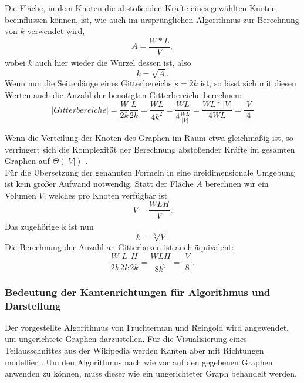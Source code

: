 \documentclass[12pt, a4paper]{article}
\begin{document}
Die Fläche, in dem Knoten die abstoßenden Kräfte eines gewählten Knoten beeinflussen können, ist, wie auch im ursprünglichen Algorithmus zur Berechnung von $k$ verwendet wird,
\begin{equation}
A = \frac{W*L}{|V|},
\end{equation}
wobei $k$ auch hier wieder die Wurzel dessen ist, also
\begin{equation}
k = \sqrt{A}.
\end{equation}
Wenn nun die Seitenlänge eines Gitterbereichs $s=2k$ ist, so lässt sich mit diesen Werten auch die Anzahl der benötigten Gitterbereiche berechnen:
\begin{equation}
|Gitterbereiche| = \frac{W}{2k}\frac{L}{2k} = \frac{WL}{4k^2} = \frac{WL}{4\frac{WL}{|V|}} = \frac{WL*|V|}{4WL} = \frac{|V|}{4}
\end{equation}

Wenn die Verteilung der Knoten des Graphen im Raum etwa gleichmäßig ist, so verringert sich die Komplexität der Berechnung abstoßender Kräfte im gesamten Graphen auf $\Theta(|V|)$ \cite[S.~1137]{fruchterman1991graph}.\\

Für die Übersetzung der genannten Formeln in eine dreidimensionale Umgebung ist kein großer Aufwand notwendig. Statt der Fläche $A$ berechnen wir ein Volumen $V$, welches pro Knoten verfügbar ist
\begin{equation}
V = \frac{WLH}{|V|}.
\end{equation}
Das zugehörige k ist nun
\begin{equation}
k = \sqrt[3]{V}.
\end{equation}
Die Berechnung der Anzahl an Gitterboxen ist auch äquivalent:
\begin{equation} \label{gridBoxes3D}
\frac{W}{2k}\frac{L}{2k}\frac{H}{2k} = \frac{WLH}{8k^3} = \frac{|V|}{8}.
\end{equation}

\subsubsection{Bedeutung der Kantenrichtungen für Algorithmus und Darstellung}
Der vorgestellte Algorithmus von Fruchterman und Reingold wird angewendet, um ungerichtete Graphen darzustellen. Für die Visualisierung eines Teilausschnittes aus der Wikipedia werden Kanten aber mit Richtungen modelliert. Um den Algorithmus nach wie vor auf den gegebenen Graphen anwenden zu können, muss dieser wie ein ungerichteter Graph behandelt werden.\\
\end{document}
